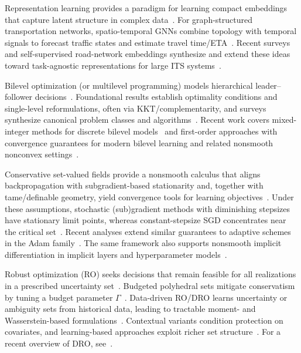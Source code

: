 \documentclass[11pt, letterpaper, oneside, reqno]{amsart}
\begin{document}
Representation learning provides a paradigm for learning compact embeddings that capture latent structure in complex data~\cite{ref:bengio2013representation, ref:lecun2015deep}. For graph-structured transportation networks, spatio-temporal GNNs combine topology with temporal signals to forecast traffic states and estimate travel time/ETA~\cite{ref:li2017diffusion, ref:yu2018stgcn, ref:wu2019graphwavenet, ref:derrowpinion2021eta}. Recent surveys and self-supervised road-network embeddings synthesize and extend these ideas toward task-agnostic representations for large ITS systems~\cite{ref:rahmani2023graph, ref:wang2020rlrn, ref:chang2023spatial}.

Bilevel optimization (or multilevel programming) models hierarchical leader--follower decisions~\cite{ref:bracken1973mathematical, ref:bard1998practical}. Foundational results establish optimality conditions and single-level reformulations, often via KKT/complementarity, and surveys synthesize canonical problem classes and algorithms~\cite{ref:dempe2002foundations, ref:fortuny1981representation, ref:colson2005bilevel}. Recent work covers mixed-integer methods for discrete bilevel models~\cite{ref:kleinert2021survey} and first-order approaches with convergence guarantees for modern bilevel learning and related nonsmooth nonconvex settings~\cite{ref:ji2021convergence, ref:lu2025tsp, ref:cao2025complexity, ref:cutkosky2023optimal}.

Conservative set-valued fields provide a nonsmooth calculus that aligns backpropagation with subgradient-based stationarity and, together with tame/definable geometry, yield convergence tools for learning objectives~\cite{ref:bolte2021conservative, ref:ioffe2009invitation}. Under these assumptions, stochastic (sub)gradient methods with diminishing stepsizes have stationary limit points, whereas constant-stepsize SGD concentrates near the critical set~\cite{ref:davis2020stochastic, ref:bianchi2022convergence}. Recent analyses extend similar guarantees to adaptive schemes in the Adam family~\cite{ref:kingma2015adam, ref:reddi2018adam, ref:xiao2024adam}. The same framework also supports nonsmooth implicit differentiation in implicit layers and hyperparameter models~\cite{ref:bolte2021nonsmooth}.

Robust optimization (RO) seeks decisions that remain feasible for all realizations in a prescribed uncertainty set~\cite{ref:ben2009robust, ref:bertsimas2011theory}. Budgeted polyhedral sets mitigate conservatism by tuning a budget parameter $\Gamma$~\cite{ref:bertsimas2004price}. Data-driven RO/DRO learns uncertainty or ambiguity sets from historical data, leading to tractable moment- and Wasserstein-based formulations~\cite{ref:delage2010distributionally, ref:mohajerin2018data, ref:bertsimas2018data}. Contextual variants condition protection on covariates, and learning-based approaches exploit richer set structure~\cite{ref:kannan2024residuals, ref:bandi2022cro, ref:goerigk2023dnn}. For a recent overview of DRO, see~\cite{ref:kuhn2025dro}.
\end{document}
